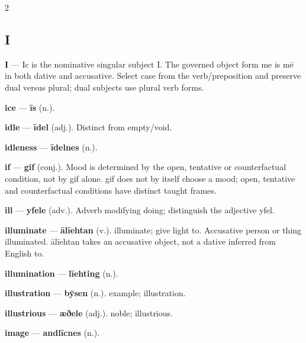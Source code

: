 \begin{multicols}{2}
\subsection*{I}
\textbf{I} — Ic is the nominative singular subject I. The governed object form me is mē in both dative and accusative. Select case from the verb/preposition and preserve dual versus plural; dual subjects use plural verb forms.\par
\textbf{ice} — \textbf{īs} (n.).\par
\textbf{idle} — \textbf{īdel} (adj.). Distinct from empty/void.\par
\textbf{idleness} — \textbf{īdelnes} (n.).\par
\textbf{if} — \textbf{gif} (conj.). Mood is determined by the open, tentative or counterfactual condition, not by gif alone. gif does not by itself choose a mood; open, tentative and counterfactual conditions have distinct taught frames.\par
\textbf{ill} — \textbf{yfele} (adv.). Adverb modifying doing; distinguish the adjective yfel.\par
\textbf{illuminate} — \textbf{ālīehtan} (v.). illuminate; give light to. Accusative person or thing illuminated. ālīehtan takes an accusative object, not a dative inferred from English to.\par
\textbf{illumination} — \textbf{līehting} (n.).\par
\textbf{illustration} — \textbf{bȳsen} (n.). example; illustration.\par
\textbf{illustrious} — \textbf{æðele} (adj.). noble; illustrious.\par
\textbf{image} — \textbf{andlīcnes} (n.).\par

\end{multicols}
